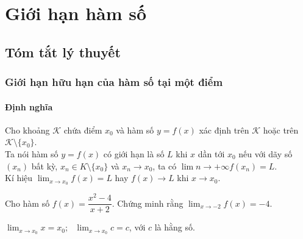 \section{Giới hạn hàm số}
\subsection{Tóm tắt lý thuyết}
\subsubsection{Giới hạn hữu hạn của hàm số tại một điểm}
\paragraph{Định nghĩa}
\begin{dn}
Cho khoảng $\mathscr{K}$ chứa điểm $x_0$ và hàm số $y=f(x)$ xác định trên $\mathscr{K}$ hoặc trên $\mathscr{K}\setminus \{x_0\}$.\\
Ta nói hàm số $y = f(x)$ có giới hạn là số $L$ khi $x$ dần tới $x_0$ nếu với dãy số $(x_n)$ bất kỳ, $x_n\in K\setminus \{x_0\}$ và $x_n\to x_0$, ta có $\displaystyle\lim \limits{n \to +\infty}f(x_n)=L$.\\
Kí hiệu $\displaystyle\lim_{x\to x_0} f(x)=L$ hay $f(x)\rightarrow L$ khi $x \rightarrow x_0$.
\end{dn}
\begin{vd}%
Cho hàm số $f(x) = \dfrac{x^2 - 4}{x + 2}$. Chứng minh rằng $\displaystyle\lim_{x\to -2} f(x)= -4$.
\end{vd}
\begin{note}
$\displaystyle \lim_{x \to x_0}x = x_0; \text{ }\displaystyle \lim_{x \to x_0} c = c$, với $c$ là hằng số. 
\end{note}

